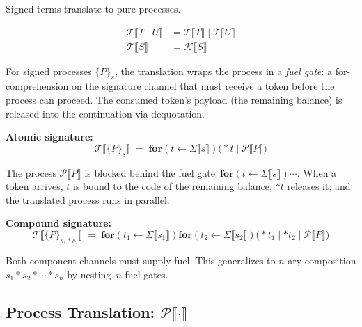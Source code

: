 \documentclass[11pt,a4paper]{article}
\newcommand{\lsem}{\llbracket}
\newcommand{\rsem}{\rrbracket}
\newcommand{\Par}{\mathbin{|}}
\newcommand{\forc}{\mathbf{for}}
\newcommand{\recv}[3]{\forc\!\left( #1 \leftarrow #2 \right) #3}
\newcommand{\drop}[1]{{\ast} #1}
\newcommand{\signed}[2]{\{#1\}_{#2}}
\newcommand{\comp}{\mathbin{*}}
\begin{document}
Signed terms translate to pure processes.

\begin{align}
  \mathcal{T}\lsem T \Par U \rsem
    &= \mathcal{T}\lsem T \rsem \Par \mathcal{T}\lsem U \rsem
    \label{eq:app-st-par}
  \\[4pt]
  \mathcal{T}\lsem S \rsem
    &= \mathcal{K}\lsem S \rsem
    \label{eq:app-st-stack}
\end{align}

\noindent
For signed processes $\signed{P}{s}$, the translation wraps
the process in a \emph{fuel gate}: a for-comprehension on the
signature channel that must receive a token before the process
can proceed.  The consumed token's payload (the remaining
balance) is released into the continuation via dequotation.

\medskip
\noindent
\textbf{Atomic signature:}
\begin{equation}
  \mathcal{T}\lsem \signed{P}{s} \rsem
  \;=\;
  \recv{t}{\Sigma\lsem s \rsem}{
    \bigl(\drop{t} \Par \mathcal{P}\lsem P \rsem\bigr)
  }
  \label{eq:app-st-signed-atomic}
\end{equation}

\noindent
The process $\mathcal{P}\lsem P \rsem$ is blocked behind the
fuel gate~$\recv{t}{\Sigma\lsem s \rsem}{\cdots}$.  When a
token arrives, $t$ is bound to the code of the remaining
balance; $\drop{t}$ releases it; and the translated process
runs in parallel.

\medskip
\noindent
\textbf{Compound signature:}
\begin{equation}
  \mathcal{T}\lsem \signed{P}{s_1 \comp s_2} \rsem
  \;=\;
  \recv{t_1}{\Sigma\lsem s_1 \rsem}{
    \recv{t_2}{\Sigma\lsem s_2 \rsem}{
      \bigl(
        \drop{t_1} \Par \drop{t_2}
        \Par \mathcal{P}\lsem P \rsem
      \bigr)
    }
  }
  \label{eq:app-st-signed-compound}
\end{equation}

\noindent
Both component channels must supply fuel.  This generalizes
to $n$-ary composition $s_1 \comp s_2 \comp \cdots \comp s_n$
by nesting~$n$ fuel gates.

\subsection{Process Translation: $\mathcal{P}\lsem\cdot\rsem$}
\label{app:proc-trans}
\end{document}
